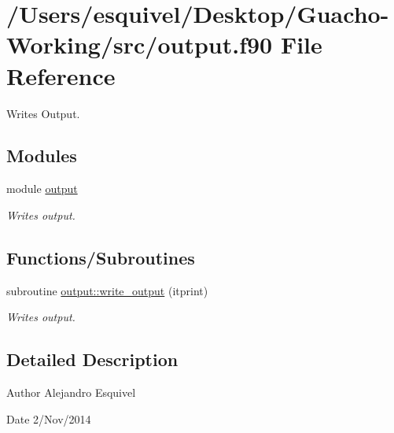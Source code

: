 \hypertarget{output_8f90}{}\section{/\+Users/esquivel/\+Desktop/\+Guacho-\/\+Working/src/output.f90 File Reference}
\label{output_8f90}


Writes Output.  


\subsection*{Modules}
\begin{DoxyCompactItemize}
\item 
module \hyperlink{namespaceoutput}{output}
\begin{DoxyCompactList}\small\item\em Writes output. \end{DoxyCompactList}\end{DoxyCompactItemize}
\subsection*{Functions/\+Subroutines}
\begin{DoxyCompactItemize}
\item 
subroutine \hyperlink{namespaceoutput_a9a6f65196f6b514f504929c9e1f7582f}{output\+::write\+\_\+output} (itprint)
\begin{DoxyCompactList}\small\item\em Writes output. \end{DoxyCompactList}\end{DoxyCompactItemize}


\subsection{Detailed Description}
\begin{DoxyAuthor}{Author}
Alejandro Esquivel 
\end{DoxyAuthor}
\begin{DoxyDate}{Date}
2/\+Nov/2014 
\end{DoxyDate}
